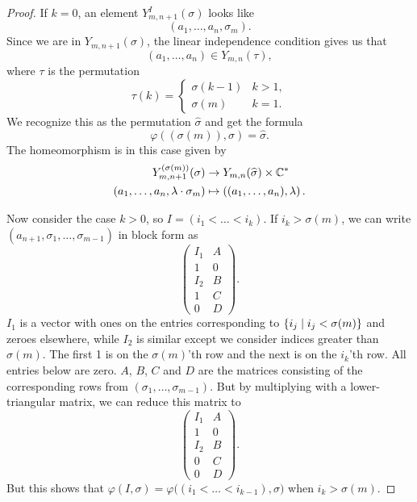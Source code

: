 \begin{proof}
  If $k = 0$, an element $Y^I_{m,n+1}(\sigma)$ looks like
  \[ (a_1,\dots,a_n,\sigma_m). \]
  Since we are in $Y_{m,n+1}(\sigma)$, the linear independence
  condition gives us that
  \[ (a_1,\dots,a_n) \in Y_{m,n}(\tau), \]
  where $\tau$ is the permutation
  \[ \tau(k) =
  \begin{cases}
    \sigma(k-1) & k > 1, \\
    \sigma(m) & k = 1.
  \end{cases} \]
  We recognize this as the permutation $\widehat\sigma$ and get the
  formula
  \[ \varphi((\sigma(m)),\sigma) = \widehat\sigma. \]
  The homeomorphism is in this case given by
  \begin{align*}
    Y_{m,n+1}^{(\sigma(m))}(\sigma) &\to Y_{m,n}(\widehat\sigma)\times
                                      \mathbb{C}^* \\
    (a_1,\dots,a_n,\lambda\cdot\sigma_m) &\mapsto
                                           \left((a_1,\dots,a_n),
                                           \lambda\right).
  \end{align*}
  
  Now consider the case $k > 0$, so $I = (i_1 < \dots < i_k)$. If $i_k
  > \sigma(m)$, we can write
  $(a_{n+1},\sigma_1,\dots,\sigma_{m-1})$ in block form as
  \[
  \begin{pmatrix}
    I_1 & A \\
    1 & 0 \\
    I_2 & B \\
    1 & C \\
    0 & D
  \end{pmatrix}.
  \]
  $I_1$ is a vector with ones on the entries corresponding
  to $\left\{ i_j \mid i_j < \sigma(m) \right\}$ and zeroes elsewhere, while
  $I_2$ is similar except we consider indices greater than
  $\sigma(m)$. The first 1 is on the $\sigma(m)$'th row and the next
  is on the $i_k$'th row. All entries below are zero. $A$, $B$, $C$
  and $D$ are the matrices consisting of the corresponding rows from
  $(\sigma_1,\dots,\sigma_{m-1})$. But by multiplying with a
  lower-triangular matrix, we can reduce this matrix to
  \[
  \begin{pmatrix}
    I_1 & A \\
    1 & 0 \\
    I_2 & B \\
    0 & C \\
    0 & D
  \end{pmatrix}.
  \]
  But this shows that $\varphi(I,\sigma) =
  \varphi\big((i_1<\dots<i_{k-1}),\sigma\big)$ when $i_k >
  \sigma(m)$.


\end{proof}
